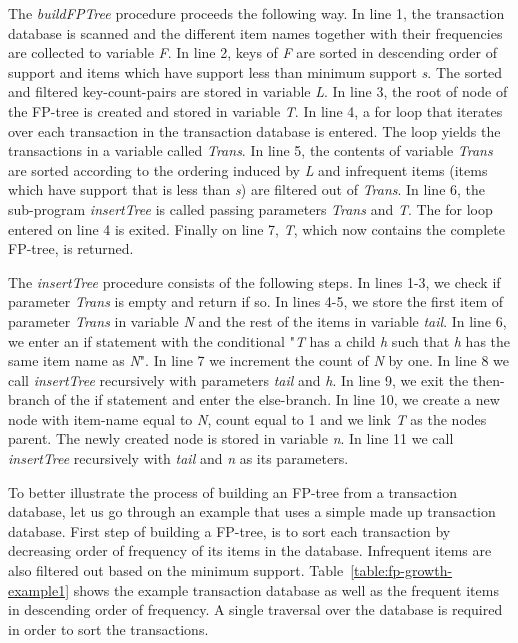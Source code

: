 The \textit{buildFPTree} procedure proceeds the following way. In line 1, the transaction database is scanned and the different item names together with their frequencies are collected to variable \textit{F}. In line 2, keys of \textit{F} are sorted in descending order of support and items which have support less than minimum support \textit{s}. The sorted and filtered key-count-pairs are stored in variable \textit{L}. In line 3, the root of node of the FP-tree is created and stored in variable \textit{T}. In line 4, a for loop that iterates over each transaction in the transaction database is entered. The loop yields the transactions in a variable called \textit{Trans}. In line 5, the contents of variable \textit{Trans} are sorted according to the ordering induced by \textit{L} and infrequent items (items which have support that is less than \textit{s}) are filtered out of \textit{Trans}. In line 6, the sub-program \textit{insertTree} is called passing parameters \textit{Trans} and \textit{T}. The for loop entered on line 4 is exited. Finally on line 7, \textit{T}, which now contains the complete FP-tree, is returned.  

The \textit{insertTree} procedure consists of the following steps. In lines 1-3, we check if parameter \textit{Trans} is empty and return if so. In lines 4-5, we store the first item of parameter \textit{Trans} in variable \textit{N} and the rest of the items in variable \textit{tail}. In line 6, we enter an if statement with the conditional "\textit{T} has a child \textit{h} such that \textit{h} has the same item name as \textit{N}". In line 7 we increment the count of \textit{N} by one. In line 8 we call \textit{insertTree} recursively with parameters \textit{tail} and \textit{h}. In line 9, we exit the then-branch of the if statement and enter the else-branch. In line 10, we create a new node with item-name equal to \textit{N}, count equal to 1 and we link \textit{T} as the nodes parent. The newly created node is stored in variable \textit{n}. In line 11 we call \textit{insertTree} recursively with \textit{tail} and \textit{n} as its parameters.

To better illustrate the process of building an FP-tree from a transaction database, let us go through an example that uses a simple made up transaction database. First step of building a FP-tree, is to sort each transaction by decreasing order of frequency of its items in the database. Infrequent items are also filtered out based on the minimum support. Table~\ref{table:fp-growth-example1} shows the example transaction database as well as the frequent items in descending order of frequency. A single traversal over the database is required in order to sort the transactions.

